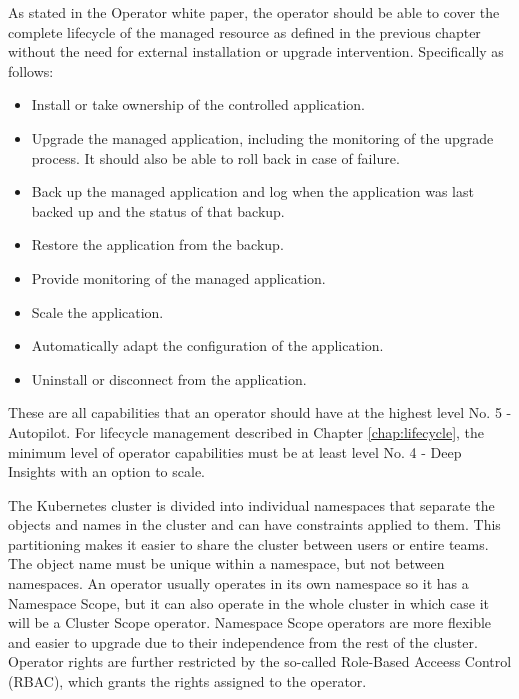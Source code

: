 
As stated in the Operator white paper, \cite{operatorWhitepaper} the operator should be able to cover the complete lifecycle of the managed resource as defined in the previous chapter without the need for external installation or upgrade intervention. Specifically as follows:
\begin{itemize}
    \item Install or take ownership of the controlled application.
    \item Upgrade the managed application, including the monitoring of the upgrade process. It should also be able to roll back in case of failure.
    \item Back up the managed application and log when the application was last backed up and the status of that backup.
    \item Restore the application from the backup.
    \item Provide monitoring of the managed application.
    \item Scale the application.
    \item Automatically adapt the configuration of the application.
    \item Uninstall or disconnect from the application.
\end{itemize}

These are all capabilities that an operator should have at the highest level No. 5 - Autopilot. For lifecycle management described in Chapter \ref{chap:lifecycle}, the minimum level of operator capabilities must be at least level No. 4 - Deep Insights with an option to scale.

The Kubernetes cluster is divided into individual namespaces that separate the objects and names in the cluster and can have constraints applied to them. This partitioning makes it easier to share the cluster between users or entire teams. The object name must be unique within a namespace, but not between namespaces.  An operator usually operates in its own namespace so it has a Namespace Scope, but it can also operate in the whole cluster in which case it will be a Cluster Scope operator. Namespace Scope operators are more flexible and easier to upgrade due to their independence from the rest of the cluster. Operator rights are further restricted by the so-called Role-Based Acceess Control (RBAC), which grants the rights assigned to the operator. \cite{ operatorsAtK8sIface}


